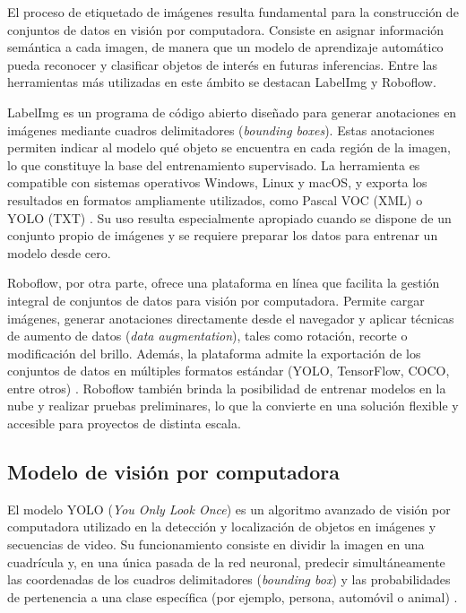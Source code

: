 El proceso de etiquetado de imágenes resulta fundamental para la construcción de conjuntos de datos en visión por computadora. Consiste en asignar información semántica a cada imagen, de manera que un modelo de aprendizaje automático pueda reconocer y clasificar objetos de interés en futuras inferencias. Entre las herramientas más utilizadas en este ámbito se destacan LabelImg y Roboflow.  

LabelImg es un programa de código abierto diseñado para generar anotaciones en imágenes mediante cuadros delimitadores (\textit{bounding boxes}). Estas anotaciones permiten indicar al modelo qué objeto se encuentra en cada región de la imagen, lo que constituye la base del entrenamiento supervisado. La herramienta es compatible con sistemas operativos Windows, Linux y macOS, y exporta los resultados en formatos ampliamente utilizados, como Pascal VOC (XML) o YOLO (TXT) \citep{WEBSITE:LabelImg}. Su uso resulta especialmente apropiado cuando se dispone de un conjunto propio de imágenes y se requiere preparar los datos para entrenar un modelo desde cero.  

Roboflow, por otra parte, ofrece una plataforma en línea que facilita la gestión integral de conjuntos de datos para visión por computadora. Permite cargar imágenes, generar anotaciones directamente desde el navegador y aplicar técnicas de aumento de datos (\textit{data augmentation}), tales como rotación, recorte o modificación del brillo. Además, la plataforma admite la exportación de los conjuntos de datos en múltiples formatos estándar (YOLO, TensorFlow, COCO, entre otros) \citep{WEBSITE:Roboflow}. Roboflow también brinda la posibilidad de entrenar modelos en la nube y realizar pruebas preliminares, lo que la convierte en una solución flexible y accesible para proyectos de distinta escala.  

\subsection{Modelo de visión por computadora}
\label{subsec:YOLO}

El modelo YOLO (\textit{You Only Look Once}) es un algoritmo avanzado de visión por computadora utilizado en la detección y localización de objetos en imágenes y secuencias de video. Su funcionamiento consiste en dividir la imagen en una cuadrícula y, en una única pasada de la red neuronal, predecir simultáneamente las coordenadas de los cuadros delimitadores (\textit{bounding box}) y las probabilidades de pertenencia a una clase específica (por ejemplo, persona, automóvil o animal) \citep{WEBSITE:YOLO}.


